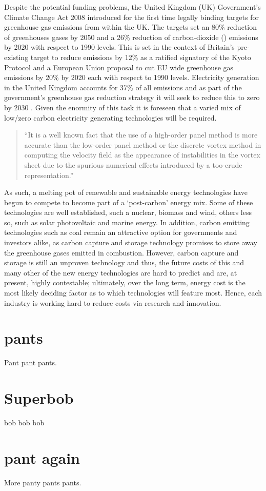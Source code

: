 Despite the potential funding problems, the United Kingdom (UK) Government's
Climate Change Act 2008
\citep*[see][2008]{CCA:2008:Defra} introduced for the first time legally binding
targets for
greenhouse gas emissions from within the UK. The targets set an 80\% reduction
of greenhouses gases
by 2050 and a 26\% reduction of carbon-dioxide () emissions by 2020 with
respect to 1990
levels. This is set in the context of Britain's pre-existing target to reduce
 emissions by
12\% as a ratified signatory of the Kyoto Protocol and a European Union proposal
to cut EU wide
greenhouse gas emissions by 20\% by 2020 each with respect to 1990 levels.
Electricity generation in
the United Kingdom accounts for 37\% of all  emissions and as part of
the government's
greenhouse gas reduction strategy it will seek to reduce this to zero by 2030
\citep[see][2008]{CCC:2008}. Given the enormity of this task it is foreseen that
a varied mix of
low/zero carbon electricity generating technologies will be required.
\begin{quote}
 ``It is a well known fact that the use of a high-order panel method is more
accurate than the
low-order panel method or the discrete vortex method in computing the velocity
field as the
appearance of instabilities in the vortex sheet due to the spurious numerical
effects introduced by
a too-crude representation.''
\end{quote}
As such, a melting pot of renewable and sustainable energy technologies have
begun to compete to
become part of a `post-carbon' energy mix. Some of these technologies are well
established, such a
nuclear, biomass and wind, others less so, such as solar photovoltaic and marine
energy. In
addition, carbon emitting technologies such as coal remain an attractive option
for governments and
investors alike, as carbon capture and storage technology promises to store away
the greenhouse
gases emitted in combustion. However, carbon capture and storage is still an
unproven technology and
thus, the future costs of this and many other of the new energy technologies are
hard to predict and
are, at present, highly contestable; ultimately, over the long term, energy cost
is the most likely
deciding factor as to which technologies will feature most. Hence, each industry
is working hard to
reduce costs via research and innovation.

\chapter{pants}

Pant pant pants.


\chapter{Superbob}

bob bob bob

\chapter{pant again}

More panty pants pants.